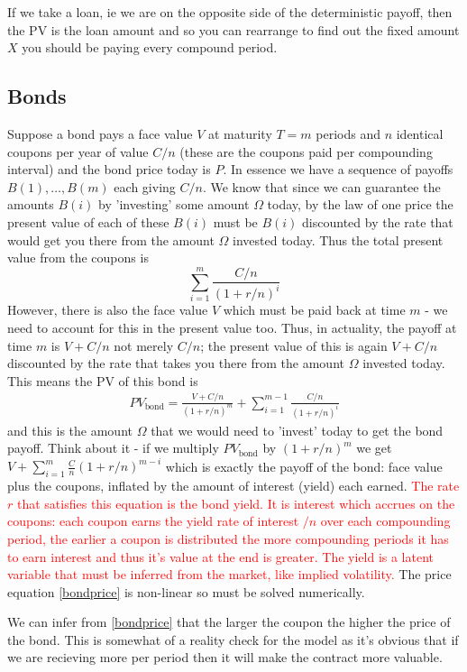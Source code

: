 \documentclass[9pt]{extarticle}
\begin{document}
If we take a loan, ie we are on the opposite side of the deterministic payoff, 
then the PV is the loan amount and so you can rearrange to find out the 
fixed amount $X$ you should be paying every compound period.

\subsection{Bonds}

Suppose a bond pays a face value $V$ at maturity $T=m$ periods 
and $n$ identical coupons per year of value $C/n$ (these are the coupons paid per 
compounding interval) and the bond price today is $P$. In essence we have a 
sequence of payoffs $B(1),\ldots, B(m)$ each giving $C/n$. We know that since 
we can guarantee the amounts $B(i)$ by 'investing' some amount $\Omega$ today, by the law of one price the 
present value of each of these $B(i)$ must be $B(i)$ discounted by 
the rate that would get you there from the amount $\Omega$ invested today. Thus the 
total present value from the coupons is 
$$ \sum_{i=1}^m \frac{C/n}{(1+r/n)^i}$$ 
However, there is also the face value $V$ which must be paid back at time $m$ - we need to account for this 
in the present value too. Thus, in actuality, the 
payoff at time $m$ is $V+C/n$ not merely $C/n$; the present value of this is again $V+C/n$ discounted by 
the rate that takes you there from the amount $\Omega$ invested today. This means the PV of this bond is 
\begin{align}
  PV_{\text{bond}} = \frac{V+C/n}{(1+r/n)^m} + \sum_{i=1}^{m-1} \frac{C/n}{(1+r/n)^i}\label{bondprice}
\end{align}
and this is the amount $\Omega$ that we would need to 'invest' today to get the bond payoff. Think about it - if we multiply 
$PV_{\text{bond}}$ by $(1+r/n)^m$ we get $V+\sum_{i=1}^{m}\frac{C}{n}(1+r/n)^{m-i}$ which is exactly the payoff of the bond: face value 
plus the coupons, inflated by the amount of interest (yield) each earned.
\textcolor{red}{The rate $r$ that satisfies this equation is the bond yield. It is interest which accrues on the coupons: each coupon 
earns the yield rate of interest $/n$ over each compounding period, the earlier a coupon is distributed the more 
compounding periods it has to earn interest and thus it's value at the end is greater. 
The yield is a latent variable that must be inferred 
from the market, like implied volatility.} The price equation 
\eqref{bondprice} is non-linear so must be solved numerically.

We can infer from \eqref{bondprice} that the larger the coupon the higher the price of the bond. This is 
somewhat of a reality check for the model 
as it's obvious that if we are recieving more per period then it will make the contract more valuable.
\end{document}
